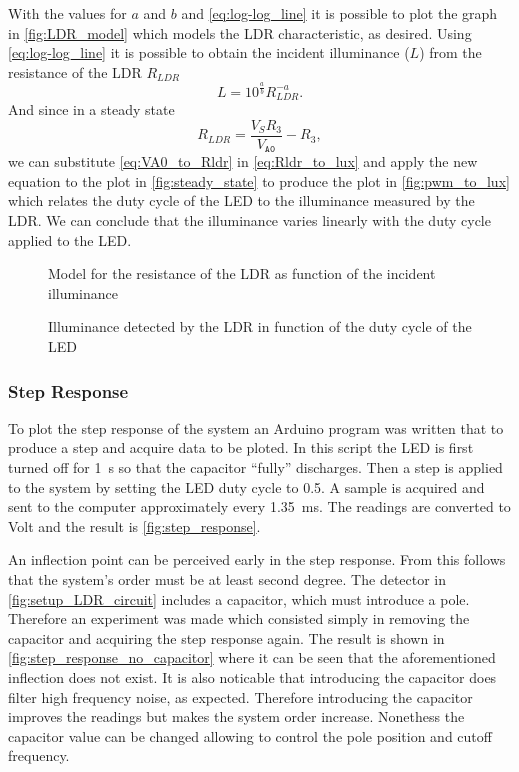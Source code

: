 With the values for $a$ and $b$ and \eqref{eq:log-log_line} it is possible to plot the graph in \autoref{fig:LDR_model} which models the LDR characteristic, as desired. Using \eqref{eq:log-log_line} it is possible to obtain the incident illuminance ($L$) from the resistance of the LDR $R_{LDR}$
\begin{equation} \label{eq:Rldr_to_lux}
    L = 10^{\frac{a}{b}} R_{LDR}^{-a} .
\end{equation}
And since in a steady state
\begin{equation} \label{eq:VA0_to_Rldr}
    R_{LDR} = \frac{V_S R_3}{V_{\texttt{A0}}} - R_3 ,
\end{equation}
we can substitute \eqref{eq:VA0_to_Rldr} in \eqref{eq:Rldr_to_lux} and apply the new equation to the plot in \autoref{fig:steady_state} to produce the plot in \autoref{fig:pwm_to_lux} which relates the duty cycle of the LED to the illuminance measured by the LDR. We can conclude that the illuminance varies linearly with the duty cycle applied to the LED.

\begin{figure}[h]
    \centering
    \resizebox{\textwidth}{!}{}
    \caption{Model for the resistance of the LDR as function of the incident illuminance}
    \label{fig:LDR_model}
\end{figure}

\begin{figure}[h]
    \centering
    \resizebox{\textwidth}{!}{}
    \caption{Illuminance detected by the LDR in function of the duty cycle of the LED}
    \label{fig:pwm_to_lux}
\end{figure}


\subsubsection{Step Response}
\label{sub:StepResponse}

To plot the step response of the system an Arduino program was written that to produce a step and acquire data to be ploted. In this script the LED is first turned off for \SI{1}{\second} so that the capacitor ``fully'' discharges. Then a step is applied to the system by setting the LED duty cycle to 0.5. A sample is acquired and sent to the computer approximately every \SI{1.35}{\milli\second}. The readings are converted to Volt and the result is \autoref{fig:step_response}.

An inflection point can be perceived early in the step response. From this follows that the system's order must be at least second degree. The detector in \autoref{fig:setup_LDR_circuit} includes a capacitor, which must introduce a pole. Therefore an experiment was made which consisted simply in removing the capacitor and acquiring the step response again. The result is shown in \autoref{fig:step_response_no_capacitor} where it can be seen that the aforementioned inflection does not exist. It is also noticable that introducing the capacitor does filter high frequency noise, as expected. Therefore introducing the capacitor improves the readings but makes the system order increase. Nonethess the capacitor value can be changed allowing to control the pole position and cutoff frequency.

